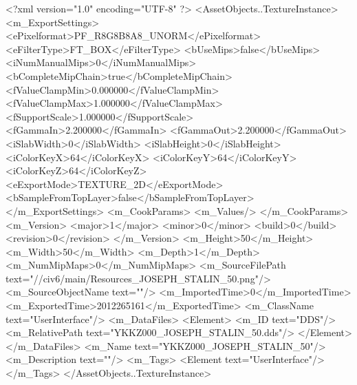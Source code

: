 <?xml version="1.0" encoding="UTF-8" ?>
<AssetObjects..TextureInstance>
	<m_ExportSettings>
		<ePixelformat>PF_R8G8B8A8_UNORM</ePixelformat>
		<eFilterType>FT_BOX</eFilterType>
		<bUseMips>false</bUseMips>
		<iNumManualMips>0</iNumManualMips>
		<bCompleteMipChain>true</bCompleteMipChain>
		<fValueClampMin>0.000000</fValueClampMin>
		<fValueClampMax>1.000000</fValueClampMax>
		<fSupportScale>1.000000</fSupportScale>
		<fGammaIn>2.200000</fGammaIn>
		<fGammaOut>2.200000</fGammaOut>
		<iSlabWidth>0</iSlabWidth>
		<iSlabHeight>0</iSlabHeight>
		<iColorKeyX>64</iColorKeyX>
		<iColorKeyY>64</iColorKeyY>
		<iColorKeyZ>64</iColorKeyZ>
		<eExportMode>TEXTURE_2D</eExportMode>
		<bSampleFromTopLayer>false</bSampleFromTopLayer>
	</m_ExportSettings>
	<m_CookParams>
		<m_Values/>
	</m_CookParams>
	<m_Version>
		<major>1</major>
		<minor>0</minor>
		<build>0</build>
		<revision>0</revision>
	</m_Version>
	<m_Height>50</m_Height>
	<m_Width>50</m_Width>
	<m_Depth>1</m_Depth>
	<m_NumMipMaps>0</m_NumMipMaps>
	<m_SourceFilePath text="//civ6/main/Resources_JOSEPH_STALIN_50.png"/>
	<m_SourceObjectName text=""/>
	<m_ImportedTime>0</m_ImportedTime>
	<m_ExportedTime>2012265161</m_ExportedTime>
	<m_ClassName text="UserInterface"/>
	<m_DataFiles>
		<Element>
			<m_ID text="DDS"/>
			<m_RelativePath text="YKKZ000_JOSEPH_STALIN_50.dds"/>
		</Element>
	</m_DataFiles>
	<m_Name text="YKKZ000_JOSEPH_STALIN_50"/>
	<m_Description text=""/>
	<m_Tags>
		<Element text="UserInterface"/>
	</m_Tags>
</AssetObjects..TextureInstance>

